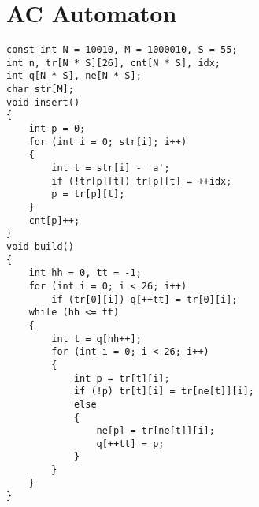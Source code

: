 \section{AC Automaton}
\begin{lstlisting}
const int N = 10010, M = 1000010, S = 55;
int n, tr[N * S][26], cnt[N * S], idx;
int q[N * S], ne[N * S];
char str[M];
void insert()
{
    int p = 0;
    for (int i = 0; str[i]; i++)
    {
        int t = str[i] - 'a';
        if (!tr[p][t]) tr[p][t] = ++idx;
        p = tr[p][t];
    }
    cnt[p]++;
}
void build()
{
    int hh = 0, tt = -1;
    for (int i = 0; i < 26; i++)
        if (tr[0][i]) q[++tt] = tr[0][i];
    while (hh <= tt)
    {
        int t = q[hh++];
        for (int i = 0; i < 26; i++)
        {
            int p = tr[t][i];
            if (!p) tr[t][i] = tr[ne[t]][i];
            else
            {
                ne[p] = tr[ne[t]][i];
                q[++tt] = p;
            }
        }
    }
}
\end{lstlisting}
